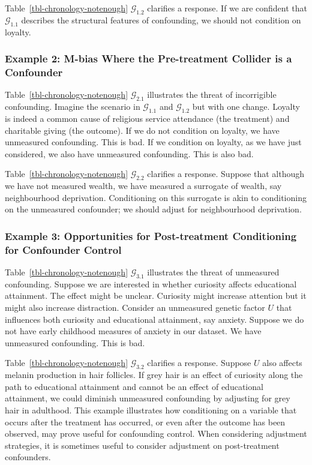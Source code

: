 \documentclass[
  single column]{article}
\begin{document}
Table~\ref{tbl-chronology-notenough} \(\mathcal{G}_{1.2}\) clarifies a
response. If we are confident that \(\mathcal{G}_{1.1}\) describes the
structural features of confounding, we should not condition on loyalty.

\subsubsection{Example 2: M-bias Where the Pre-treatment Collider is a
Confounder}\label{example-2-m-bias-where-the-pre-treatment-collider-is-a-confounder}

Table~\ref{tbl-chronology-notenough} \(\mathcal{G}_{2.1}\) illustrates
the threat of incorrigible confounding. Imagine the scenario in
\(\mathcal{G}_{1.1}\) and \(\mathcal{G}_{1.2}\) but with one change.
Loyalty is indeed a common cause of religious service attendance (the
treatment) and charitable giving (the outcome). If we do not condition
on loyalty, we have unmeasured confounding. This is bad. If we condition
on loyalty, as we have just considered, we also have unmeasured
confounding. This is also bad.

Table~\ref{tbl-chronology-notenough} \(\mathcal{G}_{2.2}\) clarifies a
response. Suppose that although we have not measured wealth, we have
measured a surrogate of wealth, say neighbourhood deprivation.
Conditioning on this surrogate is akin to conditioning on the unmeasured
confounder; we should adjust for neighbourhood deprivation.

\subsubsection{Example 3: Opportunities for Post-treatment Conditioning
for Confounder
Control}\label{example-3-opportunities-for-post-treatment-conditioning-for-confounder-control}

Table~\ref{tbl-chronology-notenough} \(\mathcal{G}_{3.1}\) illustrates
the threat of unmeasured confounding. Suppose we are interested in
whether curiosity affects educational attainment. The effect might be
unclear. Curiosity might increase attention but it might also increase
distraction. Consider an unmeasured genetic factor \(U\) that influences
both curiosity and educational attainment, say anxiety. Suppose we do
not have early childhood measures of anxiety in our dataset. We have
unmeasured confounding. This is bad.

Table~\ref{tbl-chronology-notenough} \(\mathcal{G}_{3.2}\) clarifies a
response. Suppose \(U\) also affects melanin production in hair
follicles. If grey hair is an effect of curiosity along the path to
educational attainment and cannot be an effect of educational
attainment, we could diminish unmeasured confounding by adjusting for
grey hair in adulthood. This example illustrates how conditioning on a
variable that occurs after the treatment has occurred, or even after the
outcome has been observed, may prove useful for confounding control.
When considering adjustment strategies, it is sometimes useful to
consider adjustment on post-treatment confounders.
\end{document}
